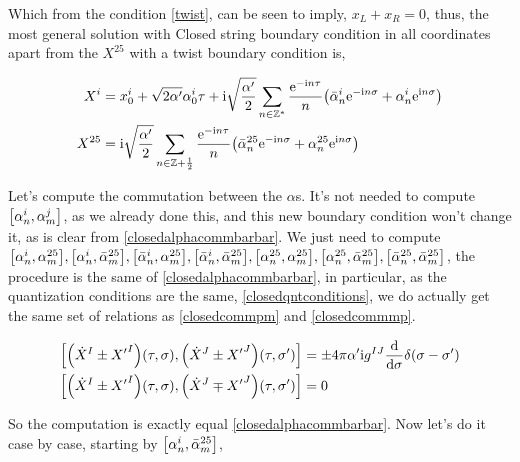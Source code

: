 Which from the condition \ref{twist}, can be seen to imply, $x_L+x_R=0$, thus, the most general solution with Closed string boundary condition in all coordinates apart from the $X^{25}$ 
with a twist boundary condition is,

\begin{align*}
    X^i&=x_0^i+\sqrt{2\alpha'} \alpha_0^i\tau+\textnormal{i}\sqrt{\frac{\alpha'}{2}}\sum\limits_{n\in\mathbb Z^\ast}\frac{\textnormal{e}^{-\textnormal{i} n\tau}}{n}\qty({\bar\alpha}^i_n\textnormal{e}^{-\textnormal{i} n\sigma}+{\alpha}^i_n\textnormal{e}^{\textnormal{i} n\sigma})\\
    X^{25}&=\textnormal{i}\sqrt{\frac{\alpha'}{2}}\sum\limits_{n\in\mathbb Z+\frac12}\frac{\textnormal{e}^{-\textnormal{i} n\tau}}{n}\qty({\bar\alpha}_n^{25}\textnormal{e}^{-\textnormal{i} n\sigma}+\alpha_n^{25}\textnormal{e}^{\textnormal{i} n\sigma})
\end{align*}

\probitem{}

Let's compute the commutation between the $\alpha$s. It's not needed to compute $\comm{\alpha_n^i}{\alpha_m^j}$, as we already done this, and this new boundary condition won't change it, as 
is clear from \ref{closedalphacommbarbar}. We just need to compute $\comm{\alpha_n^i}{\alpha_m^{25}},\comm{\alpha_n^i}{{\bar\alpha}_m^{25}},\comm{{\bar\alpha}_n^i}{\alpha_m^{25}},\comm{{\bar\alpha}_n^i}{{\bar\alpha}_m^{25}},\comm{\alpha_n^{25}}{\alpha_m^{25}},\comm{\alpha_n^{25}}{{\bar\alpha}_m^{25}},\comm{{\bar\alpha}_n^{25}}{{\bar\alpha}_m^{25}}$, 
the procedure is the same of \ref{closedalphacommbarbar}, in particular, as the quantization conditions are the same, \ref{closedqntconditions}, we do actually get the same set of relations as \ref{closedcommpm} and \ref{closedcommmp}. 

\begin{align*}
    \comm{\qty({\dot X}^I\pm{X'}^I)\qty(\tau,\sigma)}{\qty({\dot X}^J\pm{X'}^J)\qty(\tau,\sigma')}&=\pm4\pi\alpha'\im g^{IJ}\dv{}{\sigma}\delta\qty(\sigma-\sigma')\\
    \comm{\qty({\dot X}^I\pm{X'}^I)\qty(\tau,\sigma)}{\qty({\dot X}^J\mp{X'}^J)\qty(\tau,\sigma')}&=0
\end{align*}

So the computation is exactly equal \ref{closedalphacommbarbar}. Now let's do it case by case, starting by $\comm{\alpha^i_n}{{\bar\alpha}^{25}_m}$,

